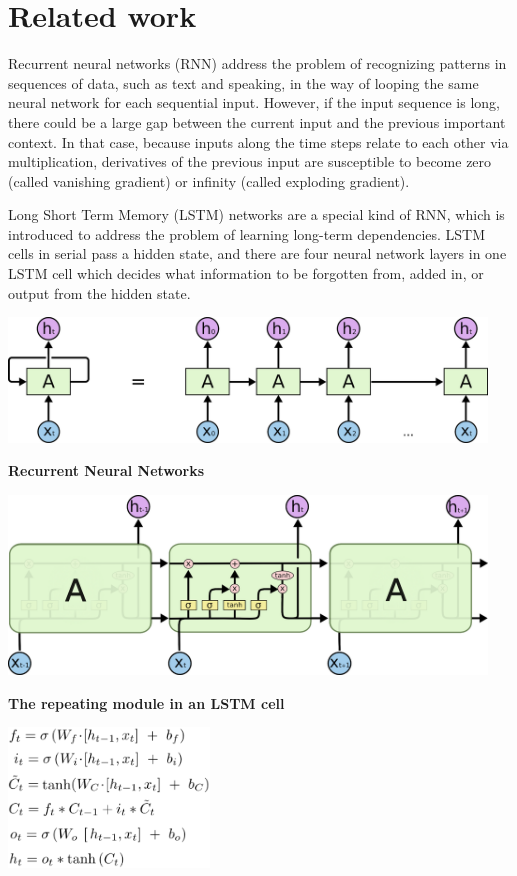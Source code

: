 \documentclass{article}
\begin{document}
\section{Related work}

Recurrent neural networks (RNN) address the problem of recognizing patterns in sequences of data, such as text and speaking, in the way of looping the same neural network for each sequential input. However, if the input sequence is long, there could be a large gap between the current input and the previous important context. In that case, because inputs along the time steps relate to each other via multiplication, derivatives of the previous input are susceptible to become zero (called vanishing gradient) or infinity (called exploding gradient). 

Long Short Term Memory (LSTM) networks are a special kind of RNN, which is introduced to address the problem of learning long-term dependencies. LSTM cells in serial pass a hidden state, and there are four neural network layers in one LSTM cell which decides what information to be forgotten from, added in, or output from the hidden state.
\vspace{10pt}

\centerline{\includegraphics[width=5in]{rnn.png}}
\centerline{\textbf{Recurrent Neural Networks}}
\vspace{10pt}

\centerline{\includegraphics[width=5in]{lstm.png}}
\centerline{\textbf{The repeating module in an LSTM cell}}
\vspace{10pt}

\centerline{\includegraphics[width=2.1in]{lstm_formulas.png}}
\end{document}
